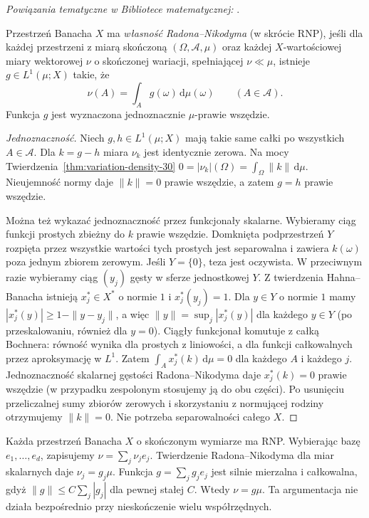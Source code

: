 \noindent\emph{Powiązania tematyczne w Bibliotece matematycznej:} .

\begin{definicja}
\label{def:RNP-30}
Przestrzeń Banacha $X$ ma \emph{własność Radona--Nikodyma}
(w skrócie RNP), jeśli dla każdej przestrzeni z miarą
skończoną $(\Omega,\mathcal A,\mu)$ oraz każdej
$X$-wartościowej miary wektorowej $\nu$ o skończonej
wariacji, spełniającej $\nu\ll\mu$, istnieje
$g\in L^1(\mu;X)$ takie, że
\begin{equation}\label{eq:RNP-30}
 \nu(A)=\int_Ag(\omega)\,\mathrm d\mu(\omega)
 \qquad(A\in\mathcal A).
\end{equation}
Funkcja $g$ jest wyznaczona jednoznacznie
$\mu$-prawie wszędzie.
\end{definicja}
\begin{proof}[Jednoznaczność]
Niech $g,h\in L^1(\mu;X)$ mają takie same całki
po wszystkich $A\in\mathcal A$. Dla $k=g-h$
miara $\nu_k$ jest identycznie zerowa. Na mocy
Twierdzenia~\ref{thm:variation-density-30}
$0=|\nu_k|(\Omega)=\int_\Omega\|k\|\,\mathrm d\mu$.
Nieujemność normy daje $\|k\|=0$ prawie wszędzie,
a zatem $g=h$ prawie wszędzie.

Można też wykazać jednoznaczność przez funkcjonały
skalarne. Wybieramy ciąg funkcji prostych zbieżny
do $k$ prawie wszędzie. Domknięta podprzestrzeń $Y$
rozpięta przez wszystkie wartości tych prostych
jest separowalna i zawiera $k(\omega)$ poza jednym
zbiorem zerowym. Jeśli $Y=\{0\}$, teza jest oczywista.
W przeciwnym razie wybieramy ciąg $(y_j)$ gęsty
w sferze jednostkowej $Y$. Z twierdzenia Hahna--Banacha
istnieją $x_j^*\in X^*$ o normie $1$ i
$x_j^*(y_j)=1$. Dla $y\in Y$ o normie $1$ mamy
$|x_j^*(y)|\ge1-\|y-y_j\|$, a więc
$\|y\|=\sup_j|x_j^*(y)|$ dla każdego $y\in Y$
(po przeskalowaniu, również dla $y=0$).
Ciągły funkcjonał komutuje z całką Bochnera:
równość wynika dla prostych z liniowości, a dla
funkcji całkowalnych przez aproksymację w $L^1$.
Zatem $\int_A x_j^*(k)\,\mathrm d\mu=0$ dla każdego
$A$ i każdego $j$. Jednoznaczność skalarnej gęstości
Radona--Nikodyma daje $x_j^*(k)=0$ prawie wszędzie
(w przypadku zespolonym stosujemy ją do obu części).
Po usunięciu przeliczalnej sumy zbiorów zerowych
i skorzystaniu z normującej rodziny otrzymujemy
$\|k\|=0$. Nie potrzeba separowalności całego $X$.
\end{proof}

\begin{przyklad}
Każda przestrzeń Banacha $X$ o skończonym wymiarze
ma RNP. Wybierając bazę $e_1,\ldots,e_d$,
zapisujemy $\nu=\sum_j\nu_je_j$.
Twierdzenie Radona--Nikodyma dla miar skalarnych
daje $\nu_j=g_j\mu$. Funkcja
$g=\sum_jg_je_j$ jest silnie mierzalna i całkowalna,
gdyż $\|g\|\le C\sum_j|g_j|$ dla pewnej stałej $C$.
Wtedy $\nu=g\mu$. Ta argumentacja nie działa
bezpośrednio przy nieskończenie wielu współrzędnych.
\end{przyklad}

